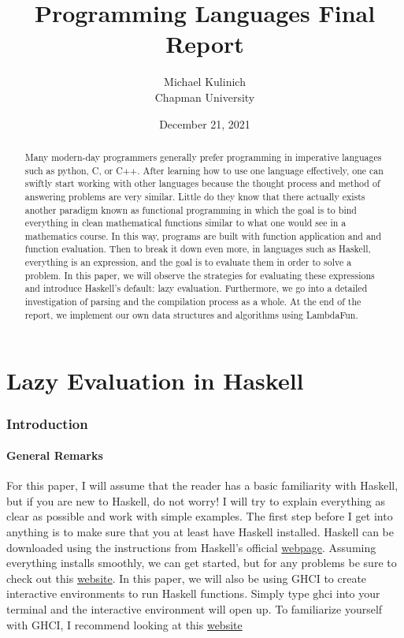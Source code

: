 \documentclass{article}
\title{Programming Languages Final Report}
\author{Michael Kulinich  \\ Chapman University}
\date{December 21, 2021}
\begin{document}
\maketitle

\begin{abstract}

\medskip\noindent
Many modern-day programmers generally prefer programming in imperative languages such as python, C, or C++. After learning how to use one language effectively, one can swiftly start working with other languages because the thought process and method of answering problems are very similar. Little do they know that there actually exists another paradigm known as functional programming in which the goal is to bind everything in clean mathematical functions similar to what one would see in a mathematics course. In this way, programs are built with function application and and function evaluation. Then to break it down even more, in languages such as Haskell, everything is an expression, and the goal is to evaluate them in order to solve a problem. In this paper, we will observe the strategies for evaluating these expressions and introduce Haskell's default: lazy evaluation. Furthermore, we go into a detailed investigation of parsing and the compilation process as a whole. At the end of the report, we implement our own data structures and algorithms using LambdaFun.
\end{abstract}

\tableofcontents

\part{Lazy Evaluation in Haskell}
\section{Introduction}\label{intro}

\subsection{General Remarks}

\medskip\noindent
For this paper, I will assume that the reader has a basic familiarity with Haskell, but if you are new to Haskell, do not worry! I will try to explain everything as clear as possible and work with simple examples. The first step before I get into anything is to make sure that you at least have Haskell installed. Haskell can be downloaded using the instructions from Haskell's official  \href{https://www.haskell.org/}{webpage}. Assuming everything installs smoothly, we can get started, but for any problems be sure to check out this \href{https://www.haskell.org/platform/}{website}. In this paper, we will also be using GHCI to create interactive environments to run Haskell functions. Simply type $\textrm{ghci}$ into your terminal and the interactive environment will open up. To familiarize yourself with GHCI, I recommend looking at this \href{https://downloads.haskell.org/~ghc/9.0.1/docs/html/users_guide/ghci.html}{website}
\end{document}
